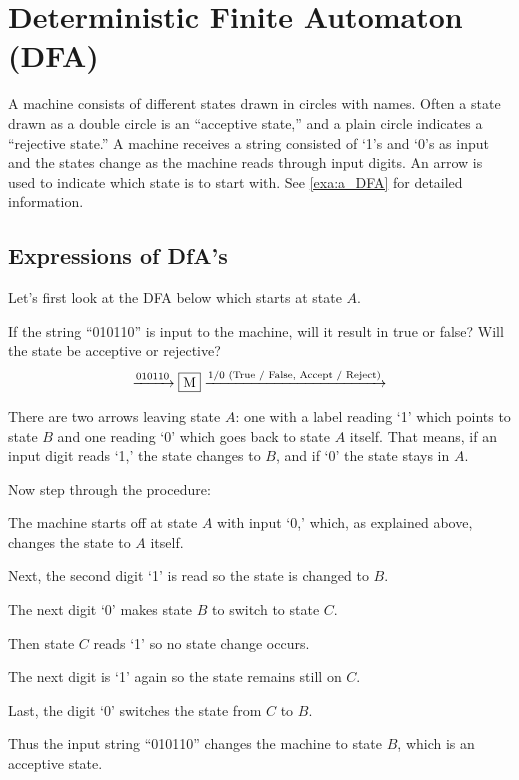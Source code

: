 
\section{Deterministic Finite Automaton (DFA)}

A machine consists of different states drawn in circles with names. Often a state drawn as
a double circle is an ``acceptive state,'' and a plain circle indicates a ``rejective
state.'' A machine receives a string consisted of `1's and `0's as input and the states
change as the machine reads through input digits. An arrow is used to indicate which state
is to start with. See \autoref{exa:a_DFA} for detailed information.

\subsection{Expressions of DfA's}

\begin{example}[A DFA]
    \label{exa:a_DFA}

    Let's first look at the DFA below which starts at state $A$.

    If the string ``010110'' is input to the machine, will it result in true or false?
    Will the state be acceptive or rejective?
    \[
        \xrightarrow{010110}
        \fbox{M}
        \xrightarrow{1/0 \text{ (True / False, Accept / Reject)}}
    \]

    There are two arrows leaving state $A$: one with a label reading `1' which points to
    state $B$ and one reading `0' which goes back to state $A$ itself. That means, if an
    input digit reads `1,' the state changes to $B$, and if `0' the state stays in $A$.

    Now step through the procedure:
    \begin{compactenum}
    \item
        The machine starts off at state $A$ with input `0,' which, as explained above,
        changes the state to $A$ itself.
    \item
        Next, the second digit `1' is read so the state is changed to $B$.
    \item
        The next digit `0' makes state $B$ to switch to state $C$.
    \item
        Then state $C$ reads `1' so no state change occurs.
    \item
        The next digit is `1' again so the state remains still on $C$.
    \item
        Last, the digit `0' switches the state from $C$ to $B$.
    \end{compactenum}
    Thus the input string ``010110'' changes the machine to state $B$, which is an
    acceptive state.

\end{example}

